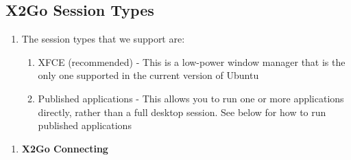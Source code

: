 \subsection{X2Go Session Types}
\begin{enumerate}
	\def\labelenumi{\arabic{enumi}.}
	\setcounter{enumi}{8}
	\item
	The session types that we support are:
	
	\begin{enumerate}
		\def\labelenumii{\arabic{enumii}.}
		\item
		XFCE (recommended) - This is a low-power window manager that is the
		only one supported in the current version of Ubuntu
		\item
		Published applications - This allows you to run one or more
		applications directly, rather than a full desktop session. See below
		for how to run published applications
	\end{enumerate}
\end{enumerate}

\begin{enumerate}
	\def\labelenumi{\Alph{enumi}.}
	\setcounter{enumi}{3}
	\item
	\textbf{X2Go Connecting}
\end{enumerate}


